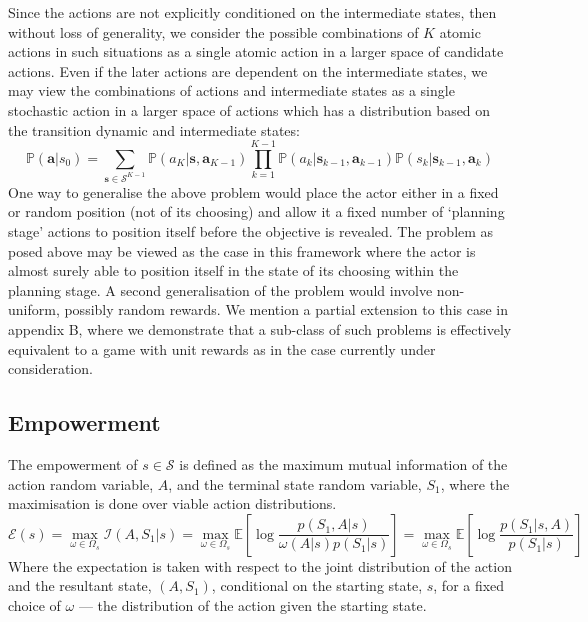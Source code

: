 \documentclass{article}
\newcommand{\EE}{\mathbb{E}}
\newcommand{\PP}{\mathbb{P}}
\newcommand{\Ss}{\mathcal{S}}
\newcommand{\Ii}{\mathcal{I}}
\newcommand{\Ee}{\mathcal{E}}
\begin{document}
Since the actions are not explicitly conditioned on the intermediate states, then without loss of generality, we consider the possible combinations of $K$ atomic actions in such situations as a single atomic action in a larger space of candidate actions.
Even if the later actions are dependent on the intermediate states, we may view the combinations of actions and intermediate states as a single stochastic action in a larger space of actions which has a distribution based on the transition dynamic and intermediate states:
\[\PP(\mathbf{a}|s_0) = \sum_{\mathbf{s}\in \Ss^{K-1}} \PP(a_K|\mathbf{s},\mathbf{a}_{K-1}) \prod_{k=1}^{K-1} \PP(a_k|\mathbf{s}_{k-1},\mathbf{a}_{k-1})\PP(s_{k}|\mathbf{s}_{k-1},\mathbf{a}_k)\]
One way to generalise the above problem would place the actor either in a fixed or random position (not of its choosing) and allow it a fixed number of `planning stage' actions to position itself before the objective is revealed. 
The problem as posed above may be viewed as the case in this framework where the actor is almost surely able to position itself in the state of its choosing within the planning stage.
A second generalisation of the problem would involve non-uniform, possibly random rewards. We mention a partial extension to this case in appendix B, where we demonstrate that a sub-class of such problems is effectively equivalent to a game with unit rewards as in the case currently under consideration. 

\subsection{Empowerment}
The empowerment of $s\in\mathcal{S}$ is defined as the maximum mutual information of the action random variable, $A$, and the terminal state random variable, $S_1$, where the maximisation is done over viable action distributions.
\[\Ee(s)=\max_{\omega\in\Omega_s}\Ii(A,S_1|s)=\max_{\omega\in\Omega_s}\EE\left[\log\frac{p(S_1,A|s)}{\omega(A|s)p(S_1|s)}\right]=\max_{\omega\in\Omega_s}\EE\left[\log\frac{p(S_1|s,A)}{p(S_1|s)}\right] \]
Where the expectation is taken with respect to the joint distribution of the action and the resultant state, $(A,S_1)$, conditional on the starting state, $s$, for a fixed choice of $\omega$ --- the distribution of the action given the starting state. 
\end{document}
